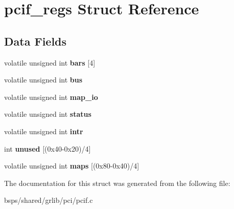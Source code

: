 \hypertarget{structpcif__regs}{}\section{pcif\+\_\+regs Struct Reference}
\label{structpcif__regs}
\subsection*{Data Fields}
\begin{DoxyCompactItemize}
\item 
\mbox{\label{structpcif__regs_afce408da992cff9b103b9338534cfd00}} 
volatile unsigned int {\bfseries bars} \mbox{[}4\mbox{]}
\item 
\mbox{\label{structpcif__regs_aadbed9f96963af8fb23ba7002b29a20e}} 
volatile unsigned int {\bfseries bus}
\item 
\mbox{\label{structpcif__regs_a34fc67a5e5a82bbf5d9dd1ca69105eb0}} 
volatile unsigned int {\bfseries map\+\_\+io}
\item 
\mbox{\label{structpcif__regs_a385bc58e4b1ce81145b5323a807cb068}} 
volatile unsigned int {\bfseries status}
\item 
\mbox{\label{structpcif__regs_a0ab9a3c9cfad4eaebe40c4ed857218ab}} 
volatile unsigned int {\bfseries intr}
\item 
\mbox{\label{structpcif__regs_a768209a23193c81965ac22d4e55f57ce}} 
int {\bfseries unused} \mbox{[}(0x40-\/0x20)/4\mbox{]}
\item 
\mbox{\label{structpcif__regs_a20e862ce05fa1249b8a7b9def41ead62}} 
volatile unsigned int {\bfseries maps} \mbox{[}(0x80-\/0x40)/4\mbox{]}
\end{DoxyCompactItemize}


The documentation for this struct was generated from the following file\+:\begin{DoxyCompactItemize}
\item 
bsps/shared/grlib/pci/pcif.\+c\end{DoxyCompactItemize}
